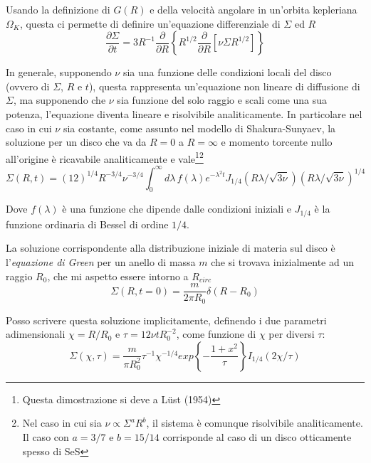 \documentclass[a4paperbi]{article}
\begin{document}
	Usando la definizione di $G(R)$ e della velocità angolare in un'orbita kepleriana $\Omega_K$,  questa ci permette di definire un'equazione differenziale di $\Sigma$ ed $R$
	\begin{equation}
		\frac{\partial\Sigma}{\partial t}=3R^{-1}\frac{\partial}{\partial R}\left\{R^{1/2}\frac{\partial}{\partial R}\left[\nu\Sigma R^{1/2}\right]\right\}
	\end{equation}
	
	In generale, supponendo $\nu$ sia una funzione delle condizioni locali del disco (ovvero di $\Sigma$, $R$ e $t$), questa rappresenta un'equazione non lineare di diffusione di $\Sigma$, ma supponendo che $\nu$ sia funzione del solo raggio e scali come una sua potenza, l'equazione diventa lineare e risolvibile analiticamente. In particolare nel caso in cui $\nu$ sia costante, come assunto nel modello di Shakura-Sunyaev, la soluzione per un disco che va da $R=0$ a $R=\infty$ e momento torcente nullo all'origine è ricavabile analiticamente e vale\footnote{Questa dimostrazione si deve a Lüst (1954)}\footnote{Nel caso in cui sia $\nu\propto\Sigma^aR^b$, il sistema è comunque risolvibile analiticamente. Il caso con $a=3/7$ e $b=15/14$ corrisponde al caso di un disco otticamente spesso di SeS}
	\begin{equation*}
		\Sigma(R,t)=(12)^{1/4}R^{-3/4}\nu^{-3/4}\int^{\infty}_0d\lambda\,f(\lambda)e^{-\lambda^2t}J_{1/4}(R\lambda/\sqrt{3\nu})(R\lambda/\sqrt{3\nu})^{1/4}
	\end{equation*}
	
	Dove $f(\lambda)$ è una funzione che dipende dalle condizioni iniziali e $J_{1/4}$ è la funzione ordinaria di Bessel di ordine $1/4$.
	
	La soluzione corrispondente alla distribuzione iniziale di materia sul disco è l'\textit{equazione di Green} per un anello di massa $m$ che si trovava inizialmente ad un raggio $R_0$, che mi aspetto essere intorno a $R_{circ}$
	\begin{equation}
		\Sigma(R,t=0)=\frac{m}{2\pi R_0}\delta(R-R_0)
	\end{equation}
	
	Posso scrivere questa soluzione implicitamente, definendo i due parametri adimensionali $\chi=R/R_0$ e $\tau=12\nu tR_0^{-2}$, come funzione di $\chi$ per diversi $\tau$:
	\begin{equation}
	\Sigma(\chi,\tau)=\frac{m}{\pi R_0^2}\tau^{-1}\chi^{-1/4}exp\left\{-\frac{1+x^2}{\tau}\right\}I_{1/4}(2\chi/\tau)
	\end{equation}
	
\end{document}
